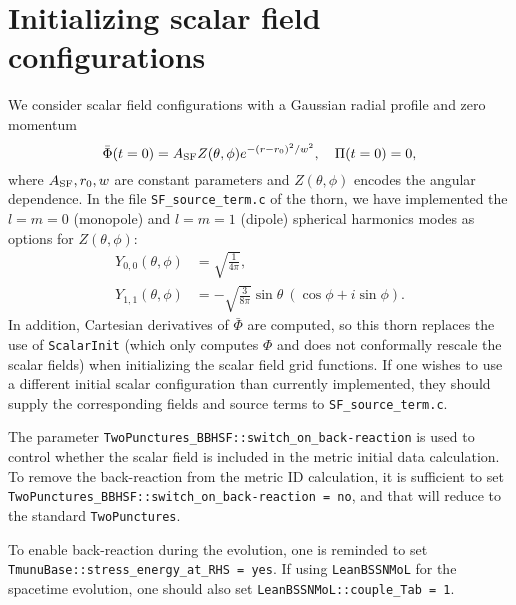 \section{Initializing scalar field configurations}
We consider scalar field configurations with a Gaussian radial profile and zero momentum
\begin{equation}
    \bar{\Phi}(t=0) = A_{\rm SF} Z(\theta, \phi) e^{-(r-r_0)^2/w^2},
    \quad
    \Pi(t=0) = 0,
\end{equation}
where $A_{\rm SF}, r_0, w$ are constant parameters
and $Z(\theta, \phi)$ encodes the angular dependence.
In the file \texttt{SF\_source\_term.c} of the thorn, we have implemented
the $l=m=0$ (monopole) and $l=m=1$ (dipole) spherical harmonics modes
as options for $Z(\theta, \phi)$:
\begin{align}
    Y_{0,0}(\theta, \phi)
    &= \sqrt{\frac{1}{4\pi}},
    \\
    Y_{1,1}(\theta, \phi)
    &= -\sqrt{\frac{3}{8\pi}} \sin\theta\ (\cos\phi + i \sin\phi).
\end{align}
In addition, Cartesian derivatives of $\bar{\Phi}$ are computed,
so this thorn replaces the use of \texttt{ScalarInit}
(which only computes $\Phi$ and does not conformally rescale the scalar fields)
when initializing the scalar field grid functions.
If one wishes to use a different initial scalar configuration than currently implemented,
they should supply the corresponding fields and source terms to \texttt{SF\_source\_term.c}.

The parameter \texttt{TwoPunctures\_BBHSF::switch\_on\_back-reaction} is used to control whether the
scalar field is included in the metric initial data calculation.
To remove the back-reaction from the metric ID calculation, it is sufficient to set
\texttt{TwoPunctures\_BBHSF::switch\_on\_back-reaction = no},
and that will reduce to the standard \texttt{TwoPunctures}.

To enable back-reaction during the evolution, one
is reminded to set \texttt{TmunuBase::stress\_energy\_at\_RHS = yes}.
If using \texttt{LeanBSSNMoL} for the spacetime evolution, one should also set
\texttt{LeanBSSNMoL::couple\_Tab = 1}.


